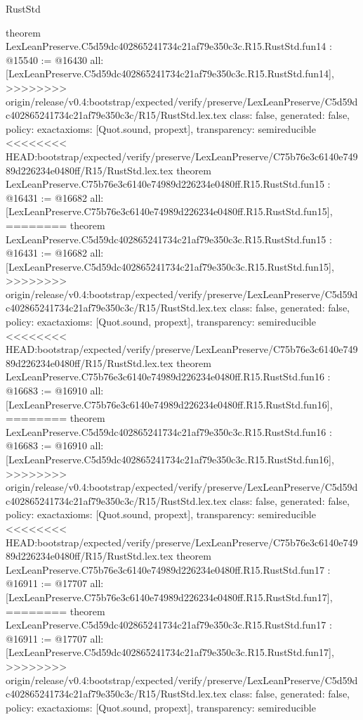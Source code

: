 \begin{lexlean}{RustStd}
\begin{coremodule}
{\begin{coremodule}
{{{{{{{{{{{{{{{{{theorem LexLeanPreserve.C5d59dc402865241734c21af79e350c3c.R15.RustStd.fun14 : @15540 := @16430 {
  all: [LexLeanPreserve.C5d59dc402865241734c21af79e350c3c.R15.RustStd.fun14],
>>>>>>>> origin/release/v0.4:bootstrap/expected/verify/preserve/LexLeanPreserve/C5d59dc402865241734c21af79e350c3c/R15/RustStd.lex.tex
  class: false,
  generated: false,
  policy: exact{axioms: [Quot.sound, propext]},
  transparency: semireducible
}
<<<<<<<< HEAD:bootstrap/expected/verify/preserve/LexLeanPreserve/C75b76e3c6140e74989d226234e0480ff/R15/RustStd.lex.tex
theorem LexLeanPreserve.C75b76e3c6140e74989d226234e0480ff.R15.RustStd.fun15 : @16431 := @16682 {
  all: [LexLeanPreserve.C75b76e3c6140e74989d226234e0480ff.R15.RustStd.fun15],
========
theorem LexLeanPreserve.C5d59dc402865241734c21af79e350c3c.R15.RustStd.fun15 : @16431 := @16682 {
  all: [LexLeanPreserve.C5d59dc402865241734c21af79e350c3c.R15.RustStd.fun15],
>>>>>>>> origin/release/v0.4:bootstrap/expected/verify/preserve/LexLeanPreserve/C5d59dc402865241734c21af79e350c3c/R15/RustStd.lex.tex
  class: false,
  generated: false,
  policy: exact{axioms: [Quot.sound, propext]},
  transparency: semireducible
}
<<<<<<<< HEAD:bootstrap/expected/verify/preserve/LexLeanPreserve/C75b76e3c6140e74989d226234e0480ff/R15/RustStd.lex.tex
theorem LexLeanPreserve.C75b76e3c6140e74989d226234e0480ff.R15.RustStd.fun16 : @16683 := @16910 {
  all: [LexLeanPreserve.C75b76e3c6140e74989d226234e0480ff.R15.RustStd.fun16],
========
theorem LexLeanPreserve.C5d59dc402865241734c21af79e350c3c.R15.RustStd.fun16 : @16683 := @16910 {
  all: [LexLeanPreserve.C5d59dc402865241734c21af79e350c3c.R15.RustStd.fun16],
>>>>>>>> origin/release/v0.4:bootstrap/expected/verify/preserve/LexLeanPreserve/C5d59dc402865241734c21af79e350c3c/R15/RustStd.lex.tex
  class: false,
  generated: false,
  policy: exact{axioms: [Quot.sound, propext]},
  transparency: semireducible
}
<<<<<<<< HEAD:bootstrap/expected/verify/preserve/LexLeanPreserve/C75b76e3c6140e74989d226234e0480ff/R15/RustStd.lex.tex
theorem LexLeanPreserve.C75b76e3c6140e74989d226234e0480ff.R15.RustStd.fun17 : @16911 := @17707 {
  all: [LexLeanPreserve.C75b76e3c6140e74989d226234e0480ff.R15.RustStd.fun17],
========
theorem LexLeanPreserve.C5d59dc402865241734c21af79e350c3c.R15.RustStd.fun17 : @16911 := @17707 {
  all: [LexLeanPreserve.C5d59dc402865241734c21af79e350c3c.R15.RustStd.fun17],
>>>>>>>> origin/release/v0.4:bootstrap/expected/verify/preserve/LexLeanPreserve/C5d59dc402865241734c21af79e350c3c/R15/RustStd.lex.tex
  class: false,
  generated: false,
  policy: exact{axioms: [Quot.sound, propext]},
  transparency: semireducible
}}}}}}}}}}}}}}}}}}}}}
\end{coremodule}}
\end{coremodule}
\end{lexlean}
